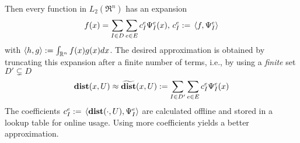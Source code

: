 Then every function in $L_2(\Re^n)$ has an expansion 
\[f(x) = \sum_{I \in D} \sum_{e \in E} c_I^e \Psi^e_I(x), \, c_I^e :=\, \langle f,\Psi^e_I \rangle\]
with $\langle h,g \rangle := \int_{\mathbb{R}^n}f(x)g(x)dx$.
The desired approximation is obtained by truncating this expansion after a finite number of terms, i.e., by using  a \textit{finite} set $D' \subsetneq D$
\begin{equation}
\mathbf{dist}(x,U) \approx \widetilde{\mathbf{dist}}(x,U) := \sum_{I \in D'} \sum_{e \in E} c_I^e \Psi^e_I(x)
\end{equation}
The coefficients $c_I^e :=\, \langle \mathbf{dist}(\cdot, U), \Psi^e_I \rangle$ are calculated offline and stored in a lookup table for online usage.
Using more coefficients yields a better approximation.




